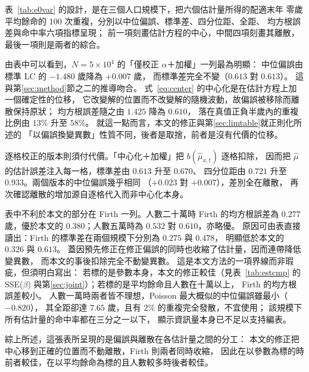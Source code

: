 \documentclass[UTF8, fontset=macnew, a4paper, 12pt]{ctexart}
\begin{document}
表~\ref{tab:e0var} 的設計，是在三個人口規模下，把六個估計量所得的配適末年
零歲平均餘命的 100 次重複，分別以中位偏誤、標準差、四分位距、全距、
均方根誤差與命中率六項指標呈現；
前一項刻畫估計方程的中心，中間四項刻畫其離散，最後一項則是兩者的綜合。

由表中可以看到，$N=5\times10^4$ 的「僅校正 $\alpha$＋加權」一列最為明顯：
中位偏誤由標準 LC 的 $-1.480$ 歲降為 $+0.007$ 歲，
而標準差完全不變（$0.613$ 對 $0.613$）。
這與第\ref{sec:method}節之二的推導吻合。
式~\eqref{eq:center} 的中心化是在估計方程上加一個確定性的位移，
它改變解的位置而不改變解的隨機波動，故偏誤被移除而離散保持原狀；
均方根誤差隨之由 $1.425$ 降為 $0.610$，
落在真值正負半歲內的重複比例由 $13\%$ 升至 $58\%$。
就這一點而言，本文的修正與第\ref{sec:limtable}就正則化所述的
「以偏誤換變異數」性質不同，後者是取捨，前者是沒有代價的位移。

逐格校正的版本則須付代價。「中心化＋加權」把 $b(\hat\mu_{x,t})$ 逐格扣除，
因而把 $\hat\mu$ 的估計誤差注入每一格，標準差由 $0.613$ 升至 $0.670$、
四分位距由 $0.721$ 升至 $0.933$。兩個版本的中位偏誤幾乎相同
（$+0.023$ 對 $+0.007$），差別全在離散，
再次確認離散的增加源自逐格代入而非中心化本身。

表中不利於本文的部分在 Firth 一列。人數二十萬時 Firth 的均方根誤差為
$0.277$ 歲，優於本文的 $0.380$；人數五萬時為 $0.532$ 對 $0.610$，亦略優。
原因可由表直接讀出：Firth 的標準差在兩個規模下分別為 $0.275$ 與 $0.478$，
明顯低於本文的 $0.326$ 與 $0.613$。
蓋因預先修正在修正偏誤的同時也收縮了估計量，因而連帶降低變異數，
而本文的事後扣除完全不動變異數。
這是本文方法的一項界線而非瑕疵，但須明白寫出：
若標的是參數本身，本文的修正較佳（見表~\ref{tab:estcmp} 的
SSE($\beta$) 與第\ref{sec:joint}）；若標的是平均餘命且人數在十萬以上，
Firth 的均方根誤差較小。
人數一萬時兩者皆不理想，Poisson 最大概似的中位偏誤雖最小（$-0.820$），
其全距卻達 $7.65$ 歲，且有 $2\%$ 的重複完全發散，不宜使用；
該規模下所有估計量的命中率都在三分之一以下，
顯示資訊量本身已不足以支持編表。

綜上所述，這張表所呈現的是偏誤與離散在各估計量之間的分工：
本文的修正把中心移到正確的位置而不動離散，Firth 則兩者同時收縮，
因此在以參數為標的時前者較佳，在以平均餘命為標的且人數較多時後者較佳。
\end{document}
